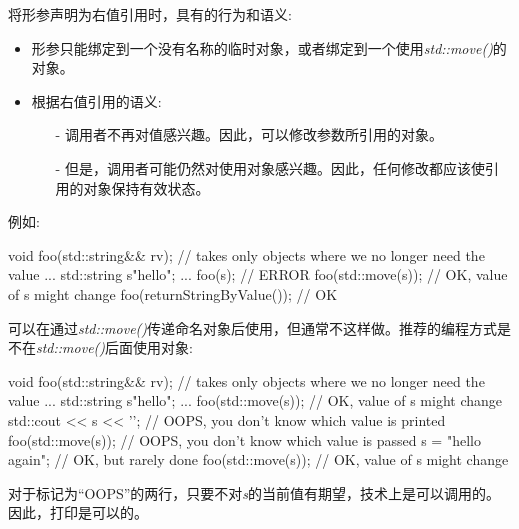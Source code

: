 将形参声明为右值引用时，具有的行为和语义:

\begin{itemize}
	\item 形参只能绑定到一个没有名称的临时对象，或者绑定到一个使用\textit{std::move()}的对象。
	\item 根据右值引用的语义:
	\begin{itemize}
		\item[-] 调用者不再对值感兴趣。因此，可以修改参数所引用的对象。
		\item[-] 但是，调用者可能仍然对使用对象感兴趣。因此，任何修改都应该使引用的对象保持有效状态。
	\end{itemize}	
\end{itemize}

例如:

\begin{cppcode}
void foo(std::string&& rv); // takes only objects where we no longer need the value
...
std::string s{"hello"};
...
foo(s); // ERROR
foo(std::move(s)); // OK, value of s might change
foo(returnStringByValue()); // OK
\end{cppcode}

可以在通过\textit{std::move()}传递命名对象后使用，但通常不这样做。推荐的编程方式是不在\textit{std::move()}后面使用对象:

\begin{cppcode}
void foo(std::string&& rv); // takes only objects where we no longer need the value
...
std::string s{"hello"};
...
foo(std::move(s)); // OK, value of s might change
std::cout << s << '\n'; // OOPS, you don’t know which value is printed
foo(std::move(s)); // OOPS, you don’t know which value is passed
s = "hello again"; // OK, but rarely done
foo(std::move(s)); // OK, value of s might change
\end{cppcode}

对于标记为“OOPS”的两行，只要不对\textit{s}的当前值有期望，技术上是可以调用的。因此，打印是可以的。




